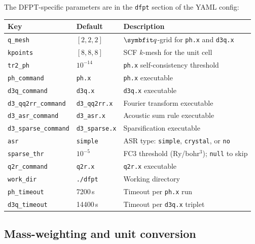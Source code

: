 The DFPT-specific parameters are in the \texttt{dfpt} section of the
YAML config:
\begin{center}
\begin{tabular}{lll}
  \toprule
  Key & Default & Description \\
  \midrule
  \texttt{q\_mesh}   & $[2,2,2]$ & $\vc{q}$-grid for \texttt{ph.x} and \texttt{d3q.x} \\
  \texttt{kpoints}   & $[8,8,8]$ & SCF $k$-mesh for the unit cell \\
  \texttt{tr2\_ph}   & $10^{-14}$& \texttt{ph.x} self-consistency threshold \\
  \texttt{ph\_command}       & \texttt{ph.x}          & \texttt{ph.x} executable \\
  \texttt{d3q\_command}      & \texttt{d3q.x}         & \texttt{d3q.x} executable \\
  \texttt{d3\_qq2rr\_command}& \texttt{d3\_qq2rr.x}   & Fourier transform executable \\
  \texttt{d3\_asr\_command}  & \texttt{d3\_asr.x}     & Acoustic sum rule executable \\
  \texttt{d3\_sparse\_command}& \texttt{d3\_sparse.x} & Sparsification executable \\
  \texttt{asr}               & \texttt{simple}        & ASR type: \texttt{simple}, \texttt{crystal}, or \texttt{no} \\
  \texttt{sparse\_thr}       & $10^{-5}$              & FC3 threshold (Ry/bohr$^3$); \texttt{null} to skip \\
  \texttt{q2r\_command}      & \texttt{q2r.x}         & \texttt{q2r.x} executable \\
  \texttt{work\_dir}         & \texttt{./dfpt}        & Working directory \\
  \texttt{ph\_timeout}       & 7200\,s                & Timeout per \texttt{ph.x} run \\
  \texttt{d3q\_timeout}      & 14400\,s               & Timeout per \texttt{d3q.x} triplet \\
  \bottomrule
\end{tabular}
\end{center}

\subsection{Mass-weighting and unit conversion}
\label{sec:ifc_mass_weighting}

